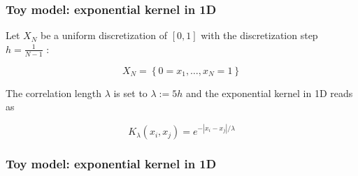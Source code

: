 \begin{frame}
\frametitle{Toy model: exponential kernel in 1D}
Let $X_N$ be a uniform discretization of $[0,1]$ with the 
discretization step $h = \frac{1}{N-1}$ : 

\[ X_N = \left\{ 0=x_1,\hdots,x_N=1\right\} 
\]

The correlation length $\lambda$ is set to $\lambda:=5h$ and the exponential kernel in 1D reads as 

\[ K_{\lambda}(x_i,x_j) = e^{-|x_i-x_j|/\lambda} 
\]
\end{frame}


\begin{frame}
\frametitle{Toy model: exponential kernel in 1D}
\end{frame}
